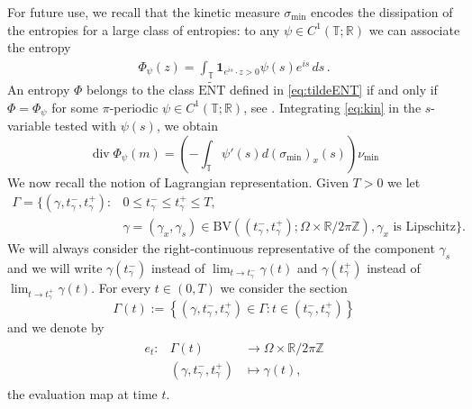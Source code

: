 \documentclass[fleqn
]{article}
\numberwithin{equation}{section}
\newcommand{\R}{{\mathbb R}}
\newcommand{\Z}{{\mathbb Z}}
\newcommand{\T}{{\mathbb T}}
\newcommand{\BV}{{\mathrm{BV}}}
\DeclareMathOperator{\dv}{div}
\theoremstyle{definition}
\begin{document}
For future use, we recall that the kinetic measure $\sigma_{\min}$ encodes the dissipation of the entropies for a large class of entropies: to any $\psi\in C^1(\T;\R)$ we can associate the entropy
\begin{align}\label{e:Phipsi}
\Phi_\psi(z)=\int_{\T} \mathbf 1_{e^{is}\cdot z >0} \psi(s)e^{is}\, ds\,.
\end{align}
An entropy $\Phi$ belongs to the class $\widetilde{\mathrm{ENT}}$ defined in \eqref{eq:tildeENT}
 if and only if $\Phi=\Phi_\psi$ for some $\pi$-periodic $\psi \in C^1(\T;\R)$, see \cite{marconi21ellipse}.
Integrating \eqref{eq:kin} in the $s$-variable tested with $\psi(s)$, we obtain
\begin{equation}\label{e:ent-kin}
 \dv \Phi_\psi(m) = \left( - \int_\T \psi'(s) d (\sigma_{\min})_x(s) \right) \nu_{\min}
\end{equation}
%
We now recall the notion of Lagrangian representation.
Given $T>0$ we let
\begin{align*}
\Gamma= \Big\{ (\gamma,t^-_\gamma,t^+_\gamma)\colon
& 0\le t^-_\gamma\le t^+_\gamma\le T, \\
&
\gamma=(\gamma_x,\gamma_s)\in \BV((t^-_\gamma,t^+_\gamma);\Omega \times \R/2\pi \Z),
 \gamma_x \mbox{ is Lipschitz} \Big\}.
\end{align*}
We will always consider the right-continuous representative of the component $\gamma_s$ and we will write $\gamma(t^-_\gamma)$ instead of $ \lim_{t\to t^-_\gamma} \gamma(t)$ and  $\gamma(t^+_\gamma)$ instead of $ \lim_{t\to t^+_\gamma} \gamma(t)$.
For every $t \in (0,T)$ we consider the section 
\begin{equation*}
 \Gamma(t):= \left\{\left(\gamma,t^-_\gamma,t^+_\gamma\right)\in  \Gamma: t \in \left(t^-_\gamma,t^+_\gamma\right)\right\}
\end{equation*}
and we denote by 
\begin{align*}
\begin{array}{crl}
 e_t\colon &
  \Gamma(t) &\longrightarrow \Omega \times \R/2\pi \Z \\
&(\gamma, t^-_\gamma, t^+_\gamma)  &\longmapsto  \gamma(t),
\end{array}
\end{align*}
the evaluation map at time $t$.
\end{document}
